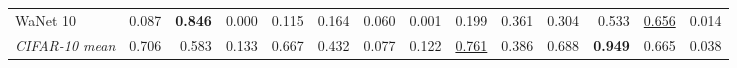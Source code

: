 \begin{table}[htbp]
\begin{adjustbox}{max width=\linewidth}
\begin{tabular}{lrrrrrrrrrrrrr}
WaNet 10 & \textcolor{black!45}{0.087} & \textbf{0.846} & \textcolor{black!45}{0.000} & \textcolor{black!45}{0.115} & \textcolor{black!45}{0.164} & \textcolor{black!45}{0.060} & \textcolor{black!45}{0.001} & \textcolor{black!45}{0.199} & \textcolor{black!45}{0.361} & \textcolor{black!45}{0.304} & 0.533 & \underline{0.656} & \textcolor{black!45}{0.014} \\
\rowcolor{black!8}\emph{CIFAR-10 mean} & 0.706 & 0.583 & \textcolor{black!45}{0.133} & 0.667 & \textcolor{black!45}{0.432} & \textcolor{black!45}{0.077} & \textcolor{black!45}{0.122} & \underline{0.761} & \textcolor{black!45}{0.386} & 0.688 & \textbf{0.949} & 0.665 & \textcolor{black!45}{0.038} \\
\bottomrule
\end{tabular}
\end{adjustbox}
\end{table}
